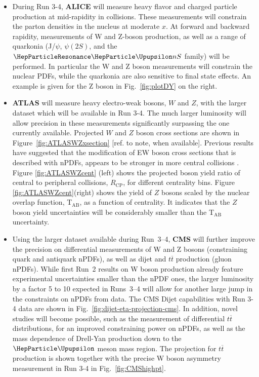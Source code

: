 \documentclass[../report.tex]{subfiles}
\begin{document}
\begin{itemize}
\item During Run 3-4, \textbf{ALICE} will measure heavy flavor and charged particle production at mid-rapidity in \pPb collisions. These measurements will constrain the parton densities in the nucleus at moderate $x$. At forward and backward rapidity, measurements of W and Z-boson production, as well as a range of quarkonia (J/$\psi$, $\psi(2S)$, and the $\PGUP{nS}$ family) will be performed. In particular the W and Z boson measurements will constrain the nuclear PDFs, while the quarkonia are also sensitive to final state effects. An example is given for the Z boson in Fig.~\ref{fig:plotDY} on the right. 
\item \textbf{ATLAS} will measure heavy electro-weak bosons, $W$ and $Z$, with the larger \pPb dataset which will be available in Run 3-4.  The much larger luminosity will allow precision in these measurements significantly surpassing the one currently available.  Projected $W$ and $Z$ boson cross sections are shown in Figure~\ref{fig:ATLASWZxsection} [ref. to note, when available].  Previous results have suggested that the modification of EW boson cross sections that is described with nPDFs, appears to be stronger in more central collisions \cite{Aad:2015gta,TheATLAScollaboration:2015lnm}.  Figure \ref{fig:ATLASWZcent} (left) shows the projected boson yield ratio of central to peripheral collisions, $R_{\mathrm{CP}}$, for different centrality bins. Figure \ref{fig:ATLASWZcent}(right) shows the yield of $Z$ bosons scaled by the nuclear overlap function, T$_{\mathrm{AB}}$,  as a function of centrality. It indicates that the $Z$ boson yield uncertainties will be considerably smaller than the T$_{\mathrm{AB}}$ uncertainty. 
\item  Using the larger \pPb dataset available during Run~3--4, \textbf{CMS} will further improve the precision on differential measurements of W and Z bosons (constraining quark and antiquark nPDFs), as well as dijet and $t\overline{t}$ production (gluon nPDFs). While first Run~2 results on W boson production already feature experimental uncertainties smaller than the nPDF ones, the larger luminosity by a factor 5 to 10 expected in Runs~3--4 will allow for another large jump in the constraints on nPDFs from data. The CMS Dijet capabilities with Run 3-4 data are shown in Fig.~\ref{fig:dijet-eta-projection-cms}. In addition, novel studies will become possible, such as the measurement of differential $t\overline{t}$ distributions, for an improved constraining power on nPDFs, as well as the mass dependence of Drell-Yan production down to the $\PGU$ meson mass region. The projection for $t\overline{t}$ production is shown together with the precise W boson asymmetry measurement in Run 3-4 in Fig.~\ref{fig:CMShighpt}.

\end{itemize}
\end{document}
